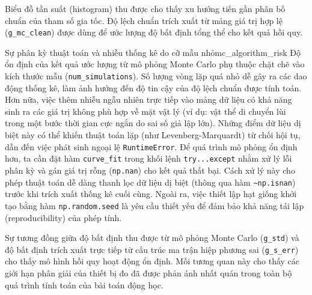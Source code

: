 Biểu đồ tần suất (histogram) thu được cho thấy xu hướng tiến gần phân bố chuẩn của tham số gia tốc. Độ lệch chuẩn trích xuất từ mảng giá trị hợp lệ (\texttt{g\_mc\_clean}) được dùng để ước lượng độ bất định tổng thể cho kết quả hồi quy.

\begin{pitfall}{Sự phân kỳ thuật toán và nhiễu thống kê do cỡ mẫu nhỏ}{mc_algorithm_risk}
Độ ổn định của kết quả ước lượng từ mô phỏng Monte Carlo phụ thuộc chặt chẽ vào kích thước mẫu (\texttt{num\_simulations}). Số lượng vòng lặp quá nhỏ dễ gây ra các dao động thống kê, làm ảnh hưởng đến độ tin cậy của độ lệch chuẩn được tính toán. Hơn nữa, việc thêm nhiễu ngẫu nhiên trực tiếp vào mảng dữ liệu có khả năng sinh ra các giá trị không phù hợp về mặt vật lý (ví dụ: vật thể di chuyển lùi trong một bước thời gian cực ngắn do sai số giả lập lớn). Những điểm dữ liệu dị biệt này có thể khiến thuật toán lặp (như Levenberg-Marquardt) từ chối hội tụ, dẫn đến việc phát sinh ngoại lệ \texttt{RuntimeError}. Để quá trình mô phỏng ổn định hơn, ta cần đặt hàm \texttt{curve\_fit} trong khối lệnh \texttt{try...except} nhằm xử lý lỗi phân kỳ và gán giá trị rỗng (\texttt{np.nan}) cho kết quả thất bại. Cách xử lý này cho phép thuật toán dễ dàng thanh lọc dữ liệu dị biệt (thông qua hàm \texttt{\textasciitilde np.isnan}) trước khi trích xuất thống kê cuối cùng. Ngoài ra, việc thiết lập hạt giống khởi tạo bằng hàm \texttt{np.random.seed} là yêu cầu thiết yếu để đảm bảo khả năng tái lập (reproducibility) của phép tính.
\end{pitfall}

Sự tương đồng giữa độ bất định thu được từ mô phỏng Monte Carlo (\texttt{g\_std}) và độ bất định trích xuất trực tiếp từ cấu trúc ma trận hiệp phương sai (\texttt{g\_s\_err}) cho thấy mô hình hồi quy hoạt động ổn định. Mối tương quan này cho thấy các giới hạn phân giải của thiết bị đo đã được phản ánh nhất quán trong toàn bộ quá trình tính toán của bài toán động học.